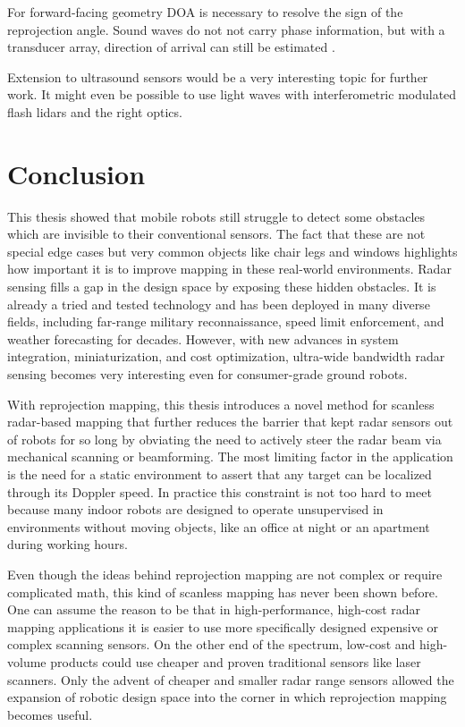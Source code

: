For forward-facing geometry DOA is necessary to resolve the sign of the
reprojection angle. Sound waves do not not carry phase information, but
with a transducer array, direction of arrival can still be estimated
\cite{Kunin2010}.

Extension to ultrasound sensors would be a very interesting topic for
further work. It might even be possible to use light waves with interferometric
modulated flash lidars and the right optics.

\section{Conclusion}\label{conclusion-1}

This thesis showed that mobile robots still struggle to detect some obstacles which are invisible to their conventional sensors. The fact that these are not special edge cases but very common objects like chair legs and windows highlights how important it is to improve mapping in these real-world environments. Radar sensing fills a gap in the design space by exposing these hidden obstacles. It is already a tried and tested technology and has been deployed in many diverse fields, including far-range military reconnaissance, speed limit enforcement, and weather forecasting for decades. However, with new advances in system integration, miniaturization, and cost optimization, ultra-wide bandwidth radar sensing becomes very interesting even for consumer-grade ground robots.

With reprojection mapping, this thesis introduces a novel method for scanless radar-based mapping that further reduces the barrier that kept radar sensors out of robots for so long by obviating the need to actively steer the radar beam via mechanical scanning or beamforming. The most limiting factor in the application is the need for a static environment to assert that any target can be localized through its Doppler speed. In practice this constraint is not too hard to meet because many indoor robots are designed to operate unsupervised in environments without moving objects, like an office at night or an apartment during working hours.

Even though the ideas behind reprojection mapping are not complex or require complicated math, this kind of scanless mapping has never been shown before. One can assume the reason to be that in high-performance, high-cost radar mapping applications it is easier to use more specifically designed expensive or complex scanning sensors. On the other end of the spectrum, low-cost and high-volume products could use cheaper and proven traditional sensors like laser scanners. Only the advent of cheaper and smaller radar range sensors allowed the expansion of robotic design space into the corner in which reprojection mapping becomes useful.

